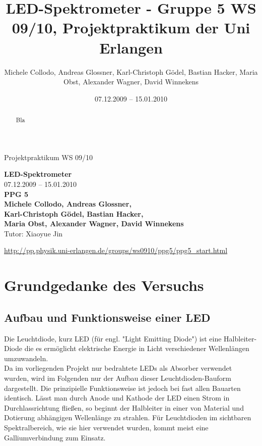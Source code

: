 \documentclass[11pt]{scrartcl}
\title{LED-Spektrometer - Gruppe 5 WS 09/10, Projektpraktikum der Uni Erlangen}
\date{07.12.2009 -- 15.01.2010}
\author{Michele Collodo, Andreas Glossner, Karl-Christoph G\"odel, Bastian Hacker, Maria Obst, Alexander Wagner, David Winnekens}
\begin{document}
\sloppy %
\thispagestyle{empty}
\large{Projektpraktikum WS 09/10}
\hfill
{}
\\[8\baselineskip]
\begin{center}
{\fontsize{36}{54}\textbf{LED-Spektrometer}}
\\[2\baselineskip]
{\Large 07.12.2009 -- 15.01.2010}
\\[7\baselineskip]
{\huge\textbf{PPG 5}}
\\[0.5\baselineskip]
{\large\textbf{
Michele Collodo,
Andreas Glossner,\\
Karl-Christoph G\"odel,
Bastian Hacker,\\
Maria Obst,
Alexander Wagner,
David Winnekens}\\
Tutor: Xiaoyue Jin}
\vfill



\small{\url{http://pp.physik.uni-erlangen.de/groups/ws0910/ppg5/ppg5\_start.html}}
\end{center}
\newpage



\tableofcontents
\vfill



\begin{abstract}
Bla
\end{abstract}
\newpage


\section{Grundgedanke des Versuchs}

\subsection{Aufbau und Funktionsweise einer LED}
Die Leuchtdiode, kurz LED (für engl. "Light Emitting Diode") ist eine Halbleiter-Diode die es ermöglicht elektrische Energie in Licht verschiedener Wellenlängen umzuwandeln.\\
Da im vorliegenden Projekt nur bedrahtete LEDs als Absorber verwendet wurden, wird im Folgenden nur der Aufbau dieser Leuchtdioden-Bauform dargestellt. Die prinzipielle Funktionsweise ist jedoch bei fast allen Bauarten identisch. Lässt man durch Anode und Kathode der LED einen Strom in Durchlassrichtung fließen, so beginnt der Halbleiter in einer von Material und Dotierung abhängigen Wellenlänge zu strahlen. Für Leuchtdioden im sichtbaren Spektralbereich, wie sie hier verwendet wurden, kommt meist eine Galliumverbindung zum Einsatz.
\end{document}
